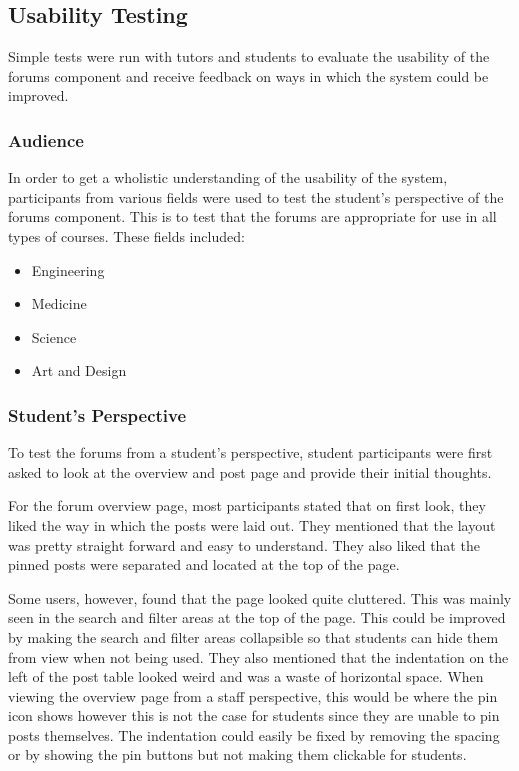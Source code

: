 \subsection{Usability Testing}

Simple tests were run with tutors and students to evaluate the usability of the forums component and receive feedback on ways in which the system could be improved.

\subsubsection{Audience}

In order to get a wholistic understanding of the usability of the system, participants from various fields were used to test the student's perspective of the forums component.
This is to test that the forums are appropriate for use in all types of courses. These fields included:

\begin{itemize}
    \item Engineering
    \item Medicine
    \item Science
    \item Art and Design
\end{itemize}

\subsubsection{Student's Perspective}

To test the forums from a student's perspective, student participants were first asked to look at the overview and post page and provide their initial thoughts.

For the forum overview page, most participants stated that on first look, they liked the way in which the posts were laid out.
They mentioned that the layout was pretty straight forward and easy to understand.
They also liked that the pinned posts were separated and located at the top of the page.

Some users, however, found that the page looked quite cluttered.
This was mainly seen in the search and filter areas at the top of the page.
This could be improved by making the search and filter areas collapsible so that students can hide them from view when not being used.
They also mentioned that the indentation on the left of the post table looked weird and was a waste of horizontal space.
When viewing the overview page from a staff perspective, this would be where the pin icon shows however this is not the case for students since they are unable to pin posts themselves.
The indentation could easily be fixed by removing the spacing or by showing the pin buttons but not making them clickable for students.

